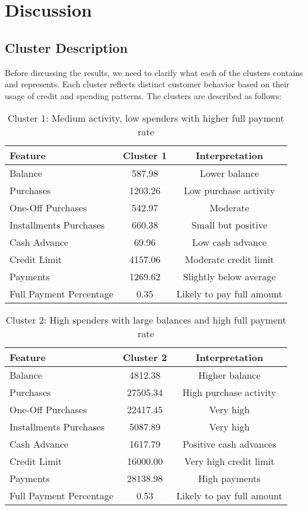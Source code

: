 \section{Discussion}

\subsection{Cluster Description}
Before discussing the results, we need to clarify what each of the clusters contains and represents. Each cluster reflects distinct customer behavior based on their usage of credit and spending patterns. The clusters are described as follows:

\begin{table}[H]
\centering
\begin{tabular}{@{}lcc@{}}
\toprule
\textbf{Feature} & \textbf{Cluster 1} & \textbf{Interpretation} \\ \midrule
Balance & 587.98 & Lower balance \\
Purchases & 1203.26 & Low purchase activity \\
One-Off Purchases & 542.97 & Moderate \\
Installments Purchases & 660.38 & Small but positive \\
Cash Advance & 69.96 & Low cash advance \\
Credit Limit & 4157.06 & Moderate credit limit \\
Payments & 1269.62 & Slightly below average \\
Full Payment Percentage & 0.35 & Likely to pay full amount \\ \bottomrule
\end{tabular}
\caption{Cluster 1: Medium activity, low spenders with higher full payment rate}
\end{table}

\begin{table}[H]
\centering
\begin{tabular}{@{}lcc@{}}
\toprule
\textbf{Feature} & \textbf{Cluster 2} & \textbf{Interpretation} \\ \midrule
Balance & 4812.38 & Higher balance \\
Purchases & 27505.34 & High purchase activity \\
One-Off Purchases & 22417.45 & Very high \\
Installments Purchases & 5087.89 & Very high \\
Cash Advance & 1617.79 & Positive cash advances \\
Credit Limit & 16000.00 & Very high credit limit \\
Payments & 28138.98 & High payments \\
Full Payment Percentage & 0.53 & Likely to pay full amount \\ \bottomrule
\end{tabular}
\caption{Cluster 2: High spenders with large balances and high full payment rate}
\end{table}

